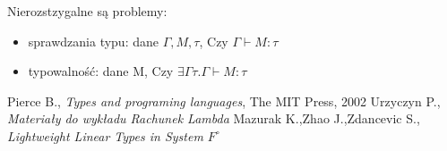 \documentclass[11pt,leqno]{article}
\begin{document}
Nierozstzygalne są problemy:
    \begin{itemize}
        \item sprawdzania typu: dane $\Gamma, M, \tau$, Czy $\Gamma \vdash M : \tau$
        \item typowalność: dane M, Czy $\exists \Gamma \tau . \Gamma \vdash M : \tau$
    \end{itemize}




\thispagestyle{empty}
\begin{thebibliography}{99}

 Pierce B., \textit{Types and programing languages}, The MIT Press, 2002 
 Urzyczyn P., \textit{Materiały do wykładu Rachunek Lambda} 
 Mazurak K.,Zhao J.,Zdancevic S., \textit{Lightweight Linear Types in System $F^\circ$}


	  
\end{thebibliography}
\end{document}
